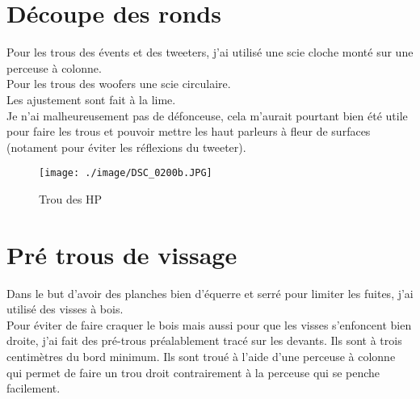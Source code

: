 \documentclass[a4paper,english]{report}
\begin{document}
			\section{Découpe des ronds}
			Pour les trous des évents et des tweeters, j'ai utilisé une scie cloche monté sur une perceuse à colonne.\\
			Pour les trous des woofers une scie circulaire.\\
			Les ajustement sont fait à la lime.\\
			Je n'ai malheureusement pas de défonceuse, cela m'aurait pourtant bien été utile pour faire les trous et pouvoir mettre les haut parleurs à fleur de surfaces (notament pour éviter les réflexions du tweeter).
				\begin{figure}[H]
					\centering
					\texttt{[image: ./image/DSC\_0200b.JPG]}
					\label{Planche}
					\caption{Trou des HP}
				\end{figure}			
			

			
			\section{Pré trous de vissage}
			Dans le but d'avoir des planches bien d'équerre et serré pour limiter les fuites, j'ai utilisé des visses à bois.\\
			Pour éviter de faire craquer le bois mais aussi pour que les visses s'enfoncent bien droite, j'ai fait des pré-trous préalablement tracé sur les devants. Ils sont à trois centimètres du bord minimum. Ils sont troué à l'aide d'une perceuse à colonne qui permet de faire un trou droit contrairement à la perceuse qui se penche facilement.\\
\end{document}
